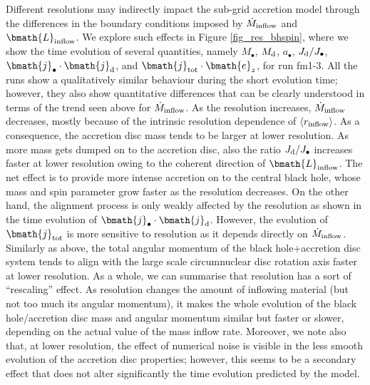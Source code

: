 \documentclass[a4paper,fleqn,usenatbib]{mnras}
\begin{document}
Different resolutions may indirectly impact the sub-grid accretion model through the differences in the boundary conditions imposed by $\dot{M}_{\rm inflow}$ and $\bmath{L}_{\rm inflow}$.
We explore such effects in Figure \ref{fig_res_bhspin}, where we show the time evolution of several quantities, namely $M_{\bullet}$, $M_{\rm d}$, $a_{\bullet}$, $J_{\rm d}/J_{\bullet}$, $\bmath{j}_{\bullet} \cdot \bmath{j}_{\rm d}$, and $\bmath{j}_{\rm tot} \cdot \bmath{e}_{z}$, for run fm1-3.
All the runs show a qualitatively similar behaviour during the short evolution time; however, they also show quantitative differences that can be clearly understood in terms of the trend seen above for $\dot{M}_{\rm inflow}$.
As the resolution increases, $\dot{M}_{\rm inflow}$ decreases, mostly because of the intrinsic resolution dependence of $\langle r_{\rm inflow} \rangle$.
As a consequence, the accretion disc mass tends to be larger at lower resolution.
As more mass gets dumped on to the accretion disc, also the ratio $J_{\rm d} / J_{\bullet}$ increases faster at lower resolution owing to the coherent direction of $\bmath{L}_{\rm inflow}$.
The net effect is to provide more intense accretion on to the central black hole, whose mass and spin parameter grow faster as the resolution decreases.
On the other hand, the alignment process is only weakly affected by the resolution as shown in the time evolution of $\bmath{j}_{\bullet} \cdot \bmath{j}_{\rm d}$.
However, the evolution of $\bmath{j}_{\rm tot}$ is more sensitive to resolution as it depends directly on $\dot{M}_{\rm inflow}$.
Similarly as above, the total angular momentum of the black hole+accretion disc system tends to align with the large scale circumnuclear disc rotation axis faster at lower resolution.
As a whole, we can summarise that resolution has a sort of ``rescaling'' effect.
As resolution changes the amount of inflowing material (but not too much its angular momentum), it makes the whole evolution of the black hole/accretion disc mass and angular momentum similar but faster or slower, depending on the actual value of the mass inflow rate.
Moreover, we note also that, at lower resolution, the effect of numerical noise is visible in the less smooth evolution of the accretion disc properties; however, this seems to be a secondary effect that does not alter significantly the time evolution predicted by the model.


\bsp
\label{lastpage}
\end{document}
